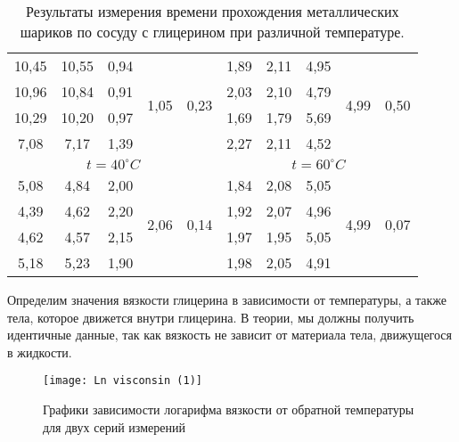 \documentclass[12pt,a4paper]{article}
\begin{document}
\begin{table}[h!]
\begin{tabular}{|c|c|c|c|c||c|c|c|c|c|}
10,45 & 10,55 & 0,94 & \multirow{4}{*}{1,05} & \multirow{4}{*}{0,23} & 1,89 & 2,11 & 4,95 & \multirow{4}{*}{4,99} & \multirow{4}{*}{0,50} \\ \cline{1-3} \cline{6-8}
10,96 & 10,84 & 0,91 &                       &                       & 2,03 & 2,10 & 4,79 &                       &                       \\ \cline{1-3} \cline{6-8}
10,29 & 10,20 & 0,97 &                       &                       & 1,69 & 1,79 & 5,69 &                       &                       \\ \cline{1-3} \cline{6-8}
7,08  & 7,17  & 1,39 &                       &                       & 2,27 & 2,11 & 4,52 &                       &                       \\ \hline
\multicolumn{5}{|c|}{$t = 40^\circ  C$}                                              & \multicolumn{5}{c|}{$t = 60^\circ C $}  \\ \hline
5,08  & 4,84  & 2,00 & \multirow{4}{*}{2,06} & \multirow{4}{*}{0,14} & 1,84 & 2,08 & 5,05 & \multirow{4}{*}{4,99} & \multirow{4}{*}{0,07} \\ \cline{1-3} \cline{6-8}
4,39  & 4,62  & 2,20 &                       &                       & 1,92 & 2,07 & 4,96 &                       &                       \\ \cline{1-3} \cline{6-8}
4,62  & 4,57  & 2,15 &                       &                       & 1,97 & 1,95 & 5,05 &                       &                       \\ \cline{1-3} \cline{6-8}
5,18  & 5,23  & 1,90 &                       &                       & 1,98 & 2,05 & 4,91 &                       &                       \\ \hline
\end{tabular}
\caption{Результаты измерения времени прохождения металлических шариков по сосуду с глицерином при различной температуре.}
\label{tab:metal_balls_measuring}
\end{table}

\newpage

Определим значения вязкости глицерина в зависимости от температуры, а также тела, которое движется внутри глицерина. В теории, мы должны получить идентичные данные, так как вязкость не зависит от материала тела, движущегося в жидкости.

\begin{figure}[h!]
	\begin{center}
		\texttt{[image: Ln visconsin (1)]}
		\caption{Графики зависимости логарифма вязкости от обратной температуры для двух серий измерений}
		\label{fig:graph_one}
	\end{center}
\end{figure}
\end{document}
